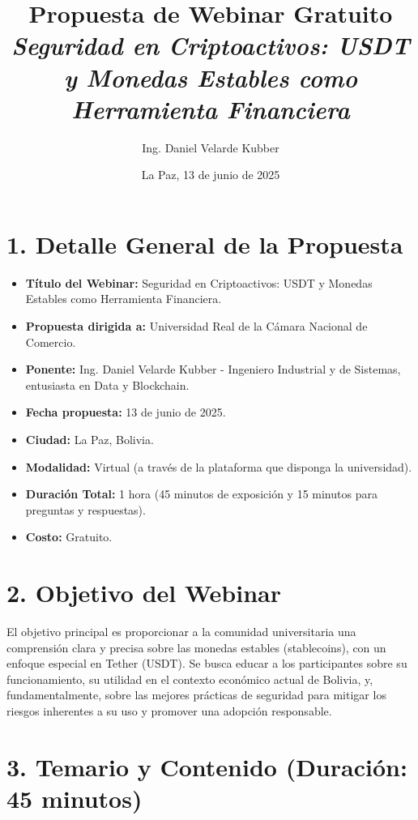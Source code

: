 \documentclass[12pt,a4paper]{article}
\title{
    \vspace{2cm}
    \textbf{Propuesta de Webinar Gratuito} \\
    \large \textit{Seguridad en Criptoactivos: USDT y Monedas Estables como Herramienta Financiera}
    \vspace{1.5cm}
}
\author{Ing. Daniel Velarde Kubber}
\date{La Paz, 13 de junio de 2025}
\begin{document}
\maketitle
\thispagestyle{empty}
\clearpage

\section*{1. Detalle General de la Propuesta}

\begin{itemize}
    \item \textbf{Título del Webinar:} Seguridad en Criptoactivos: USDT y Monedas Estables como Herramienta Financiera.
    \item \textbf{Propuesta dirigida a:} Universidad Real de la Cámara Nacional de Comercio.
    \item \textbf{Ponente:} Ing. Daniel Velarde Kubber - Ingeniero Industrial y de Sistemas, entusiasta en Data y Blockchain.
    \item \textbf{Fecha propuesta:} 13 de junio de 2025.
    \item \textbf{Ciudad:} La Paz, Bolivia.
    \item \textbf{Modalidad:} Virtual (a través de la plataforma que disponga la universidad).
    \item \textbf{Duración Total:} 1 hora (45 minutos de exposición y 15 minutos para preguntas y respuestas).
    \item \textbf{Costo:} Gratuito.
\end{itemize}

\section*{2. Objetivo del Webinar}

El objetivo principal es proporcionar a la comunidad universitaria una comprensión clara y precisa sobre las monedas estables (stablecoins), con un enfoque especial en Tether (USDT). Se busca educar a los participantes sobre su funcionamiento, su utilidad en el contexto económico actual de Bolivia, y, fundamentalmente, sobre las mejores prácticas de seguridad para mitigar los riesgos inherentes a su uso y promover una adopción responsable.

\section*{3. Temario y Contenido (Duración: 45 minutos)}
\end{document}
